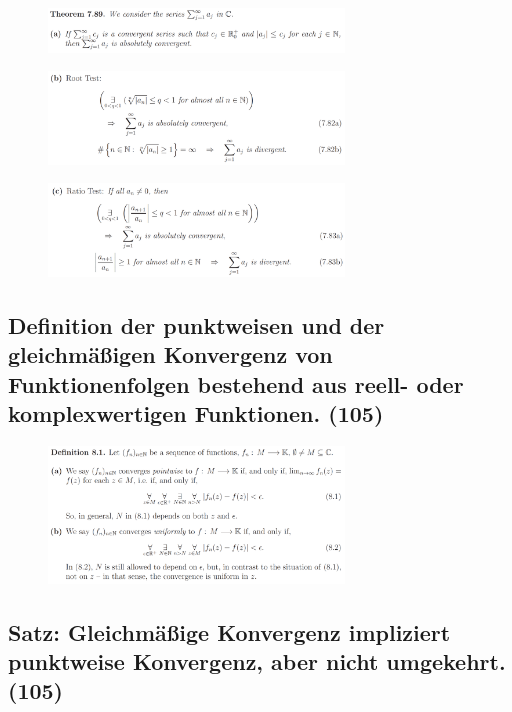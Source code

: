 \begin{figure}[H] \centering
\includegraphics[width=0.7\textwidth]{media/8-10.png}
\end{figure}
\begin{figure}[H] \centering
\includegraphics[width=0.7\textwidth]{media/8-10-2.png}
\end{figure}
\begin{figure}[H] \centering
\includegraphics[width=0.7\textwidth]{media/8-10-3.png}
\end{figure}

\subsection{Definition der punktweisen und der gleichmäßigen Konvergenz von Funktionenfolgen bestehend aus reell- oder komplexwertigen Funktionen. (105)}

\begin{figure}[H] \centering
\includegraphics[width=0.7\textwidth]{media/8-11.png}
\end{figure}

\subsection{Satz: Gleichmäßige Konvergenz impliziert punktweise Konvergenz, aber nicht umgekehrt. (105)}

